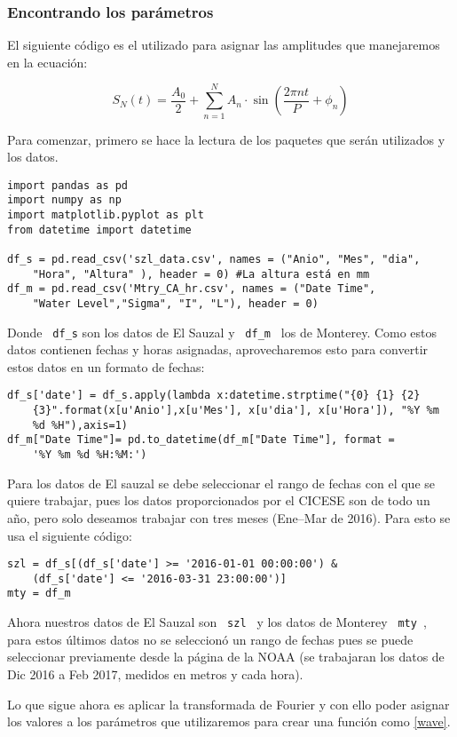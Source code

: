 \subsubsection{Encontrando los parámetros}
\noindent El siguiente código es el utilizado para asignar las amplitudes que manejaremos en la ecuación:

$$S_N(t) = \frac{A_0}{2} + \sum_{n=1}^{N} A_n\cdot\sin{(\frac{2\pi n t}{P}+ \phi_n)}$$

Para comenzar, primero se hace la lectura de los paquetes que serán utilizados y los datos.
\begin{verbatim}
import pandas as pd
import numpy as np
import matplotlib.pyplot as plt
from datetime import datetime

df_s = pd.read_csv('szl_data.csv', names = ("Anio", "Mes", "dia",
	"Hora", "Altura" ), header = 0) #La altura está en mm
df_m = pd.read_csv('Mtry_CA_hr.csv', names = ("Date Time", 
	"Water Level","Sigma", "I", "L"), header = 0)
\end{verbatim}
Donde \verb# df_s# son los datos de El Sauzal y \verb# df_m # los de Monterey. Como estos datos contienen fechas y horas asignadas, aprovecharemos esto para convertir estos datos en un formato de fechas:
\begin{verbatim}
df_s['date'] = df_s.apply(lambda x:datetime.strptime("{0} {1} {2} 
	{3}".format(x[u'Anio'],x[u'Mes'], x[u'dia'], x[u'Hora']), "%Y %m 
    %d %H"),axis=1)
df_m["Date Time"]= pd.to_datetime(df_m["Date Time"], format = 
	'%Y %m %d %H:%M:')
\end{verbatim}

Para los datos de El sauzal se debe seleccionar el rango de fechas con el que se quiere trabajar, pues los datos proporcionados por el CICESE son de todo un año, pero solo deseamos trabajar con tres meses (Ene--Mar de 2016). Para esto se usa el siguiente código:
\begin{verbatim}
szl = df_s[(df_s['date'] >= '2016-01-01 00:00:00') & 
	(df_s['date'] <= '2016-03-31 23:00:00')]
mty = df_m
\end{verbatim}
Ahora nuestros datos de El Sauzal son \verb# szl # y los datos de Monterey \verb# mty #, para estos últimos datos no se seleccionó un rango de fechas pues se puede seleccionar previamente desde la página de la NOAA (se trabajaran los datos de Dic 2016 a Feb 2017, medidos en metros y cada hora).

Lo que sigue ahora es aplicar la transformada de Fourier y con ello poder asignar los valores a los parámetros que utilizaremos para crear una función como \ref{wave}.

